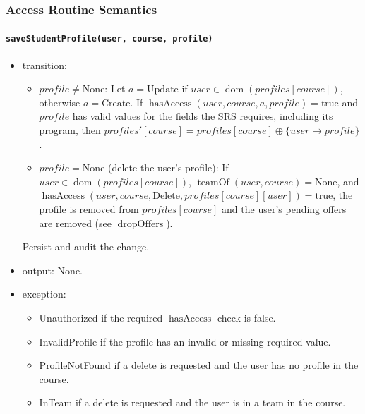\documentclass[12pt, titlepage]{article}
\begin{document}
\subsubsection{Access Routine Semantics}

\paragraph{\texttt{saveStudentProfile(user, course, profile)}}
\begin{itemize}
    \item transition:
    \begin{itemize}
        \item $profile\ne\text{None}$: Let $a=\text{Update}$ if $user\in\operatorname{dom}(\mathit{profiles}[course])$, otherwise $a=\text{Create}$. If $\operatorname{hasAccess}(user,course,a,profile)=\text{true}$ and $profile$ has valid values for the fields the SRS requires, including its program, then $\mathit{profiles}'[course]=\mathit{profiles}[course]\oplus\{user\mapsto profile\}$.
        \item $profile=\text{None}$ (delete the user's profile): If $user\in\operatorname{dom}(\mathit{profiles}[course])$, $\operatorname{teamOf}(user,course)=\text{None}$, and $\operatorname{hasAccess}(user,course,\text{Delete},\mathit{profiles}[course][user])=\text{true}$, the profile is removed from $\mathit{profiles}[course]$ and the user's pending offers are removed (see $\operatorname{dropOffers}$).
    \end{itemize}
    Persist and audit the change.
    \item output: None.
    \item exception:
    \begin{itemize}
        \item Unauthorized if the required $\operatorname{hasAccess}$ check is false.
        \item InvalidProfile if the profile has an invalid or missing required value.
        \item ProfileNotFound if a delete is requested and the user has no profile in the course.
        \item InTeam if a delete is requested and the user is in a team in the course.
    \end{itemize}
\end{itemize}
\end{document}
